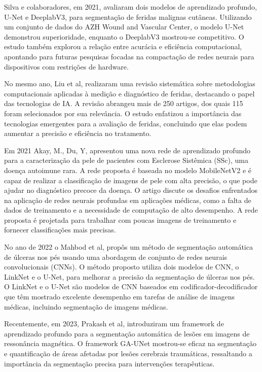Silva e colaboradores, em 2021, avaliaram dois modelos de aprendizado profundo, \ac{U-Net} e DeeplabV3, para segmentação de feridas malignas cutâneas. Utilizando um conjunto de dados do AZH Wound and Vascular Center, o modelo \ac{U-Net} demonstrou superioridade, enquanto o DeeplabV3 mostrou-se competitivo. O estudo também explorou a relação entre acurácia e eficiência computacional, apontando para futuras pesquisas focadas na compactação de redes neurais para dispositivos com restrições de hardware.~\cite{silva2021avaliacao}

No mesmo ano, Liu et al, realizaram uma revisão sistemática sobre metodologias computacionais aplicadas à medição e diagnóstico de feridas, destacando o papel das tecnologias de IA. A revisão abrangeu mais de 250 artigos, dos quais 115 foram selecionados por sua relevância. O estudo enfatizou a importância das tecnologias emergentes para a avaliação de feridas, concluindo que elas podem aumentar a precisão e eficiência no tratamento.~\cite{liu2021computational}

Em 2021 Akay, M., Du, Y, apresentou uma nova rede de aprendizado profundo para a caracterização da pele de pacientes com Esclerose Sistêmica (SSc), uma doença autoimune rara. A rede proposta é baseada no modelo \ac{MobileNetV2} e é capaz de realizar a classificação de imagens de pele com alta precisão, o que pode ajudar no diagnóstico precoce da doença. O artigo discute os desafios enfrentados na aplicação de redes neurais profundas em aplicações médicas, como a falta de dados de treinamento e a necessidade de computação de alto desempenho. A rede proposta é projetada para trabalhar com poucas imagens de treinamento e fornecer classificações mais precisas.~\cite{akay2021deep}

No ano de 2022 o Mahbod et al, propôs um método de segmentação automática de úlceras nos pés usando uma abordagem de conjunto de redes neurais convolucionais (CNNs). O método proposto utiliza dois modelos de CNN, o LinkNet e o \ac{U-Net}, para melhorar a precisão da segmentação de úlceras nos pés. O LinkNet e o \ac{U-Net} são modelos de CNN baseados em codificador-decodificador que têm mostrado excelente desempenho em tarefas de análise de imagens médicas, incluindo segmentação de imagens médicas.~\cite{mahbod2022automatic}

Recentemente, em 2023, Prakash et al, introduziram um framework de aprendizado profundo para a segmentação automática de lesões em imagens de ressonância magnética. O framework GA-UNet mostrou-se eficaz na segmentação e quantificação de áreas afetadas por lesões cerebrais traumáticas, ressaltando a importância da segmentação precisa para intervenções terapêuticas.~\cite{prakash2023end}


